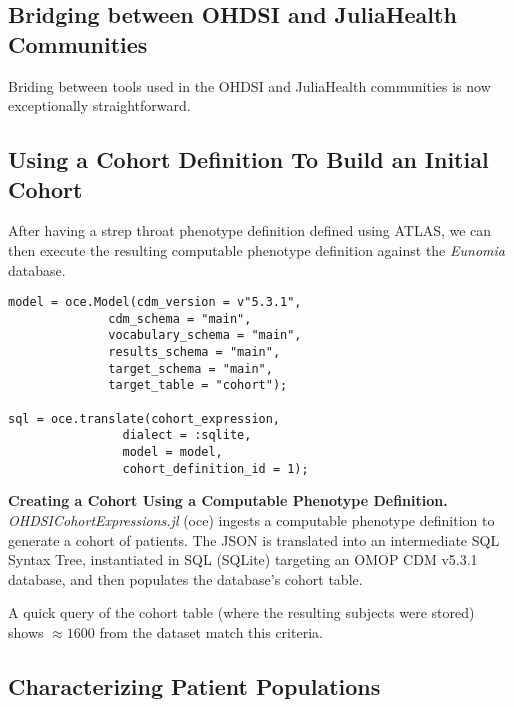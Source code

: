 \documentclass{juliacon}
\begin{document}
\subsection{Bridging between OHDSI and JuliaHealth Communities}

Briding between tools used in the OHDSI and JuliaHealth communities is now exceptionally straightforward.


\subsection{Using a Cohort Definition To Build an Initial Cohort}

After having a strep throat phenotype definition defined using ATLAS, we can then execute the resulting computable phenotype definition against the \textit{Eunomia} database.

\begin{listing}[!ht]
\begin{verbatim}
model = oce.Model(cdm_version = v"5.3.1", 
              cdm_schema = "main",
              vocabulary_schema = "main", 
              results_schema = "main",
              target_schema = "main", 
              target_table = "cohort");

sql = oce.translate(cohort_expression, 
                dialect = :sqlite, 
                model = model, 
                cohort_definition_id = 1);
\end{verbatim}
\caption{\textbf{Creating a Cohort Using a Computable Phenotype Definition.} \textit{OHDSICohortExpressions.jl} (oce) ingests a computable phenotype definition to generate a cohort of patients. The JSON is translated into an intermediate SQL Syntax Tree, instantiated in SQL (SQLite) targeting an OMOP CDM v5.3.1 database, and then populates the database's cohort table.}
\label{listing:cohort_creation}
\end{listing}

A quick query of the cohort table (where the resulting subjects were stored) shows $\approx 1600$ from the dataset match this criteria.

\subsection{Characterizing Patient Populations}
\end{document}
